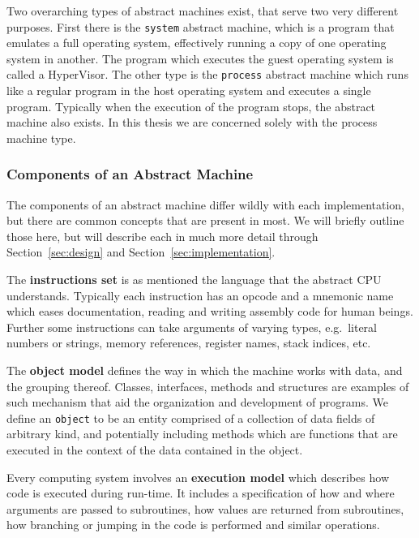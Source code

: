 
Two overarching types of abstract machines exist, that serve two very different
purposes. First there is the \texttt{system} abstract machine, which is a
program that emulates a full operating system, effectively running a copy of one
operating system in another. The program which executes the guest operating
system is called a HyperVisor\cite{NEEDED}. The other type is the
\texttt{process} abstract machine which runs like a regular program in the host
operating system and executes a single program. Typically when the execution of
the program stops, the abstract machine also exists. In this thesis we are
concerned solely with the process machine type.

\subsubsection{Components of an Abstract Machine}

The components of an abstract machine differ wildly with each implementation,
but there are common concepts that are present in most. We will briefly outline
those here, but will describe each in much more detail through
Section~\ref{sec:design} and Section~\ref{sec:implementation}.

The \textbf{instructions set} is as mentioned the language that the abstract CPU
understands. Typically each instruction has an opcode and a mnemonic name which
eases documentation, reading and writing assembly code for human beings. Further
some instructions can take arguments of varying types, e.g.~literal numbers or
strings, memory references, register names, stack indices, etc.

The \textbf{object model} defines the way in which the machine works with data,
and the grouping thereof. Classes, interfaces, methods and structures are
examples of such mechanism that aid the organization and development of
programs. We define an \texttt{object} to be an entity comprised of a collection
of data fields of arbitrary kind, and potentially including methods which are
functions that are executed in the context of the data contained in the object.

Every computing system involves an \textbf{execution model} which describes how
code is executed during run-time. It includes a specification of how and where
arguments are passed to subroutines, how values are returned from subroutines,
how branching or jumping in the code is performed and similar operations.

